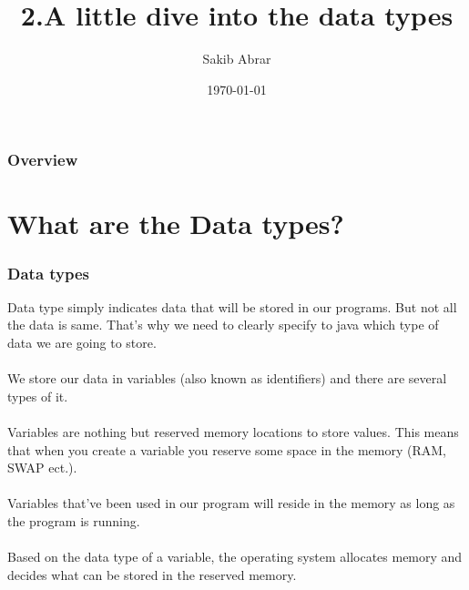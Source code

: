 \documentclass{beamer}
\title[Java Datatypes]{2.A little dive into the data types} %
\author{Sakib Abrar} %
\institute[BUET] %
{
CSE\\~\\Bangladesh University of Engineering \& Technology \\ %
\medskip
\textit{sakib.cghs@gmail.com} %
}
\date{\today} %
\begin{document}
\begin{frame}
\titlepage %
\end{frame}

\begin{frame}
\frametitle{Overview} %
\tableofcontents %
\end{frame}


\section{What are the Data types?}

\begin{frame}
\frametitle{Data types}
Data type simply indicates data that will be stored in our programs. But not all the data is same. That's why we need to clearly specify to java which type of data we are going to store.\\~\\
We store our data in variables (also known as identifiers) and there are several types of it.\\~\\
Variables are nothing but reserved memory locations to store values. This means that when you create a variable you reserve some space in the memory (RAM, SWAP ect.).\\~\\
Variables that've been used in our program will reside in the memory as long as the program is running. \\~\\
Based on the data type of a variable, the operating system allocates memory and decides what can be stored in the reserved memory.\\~\\


\end{frame}
\end{document}
